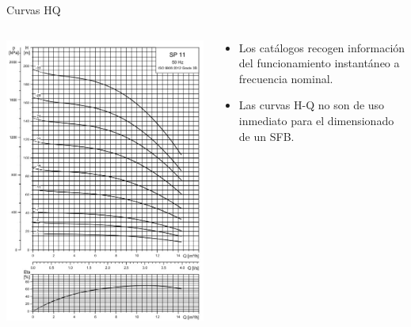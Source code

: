 \documentclass[xcolor={usenames,svgnames,dvipsnames}]{beamer}
\begin{document}
\begin{frame}[label={sec:orgbea7fac}]{Curvas HQ}
\begin{columns}
\begin{column}{0.5\columnwidth}
\begin{center}
\includegraphics[height=0.8\textheight]{../figs/CurvaSP11.jpg}
\end{center}
\end{column}

\begin{column}{0.5\columnwidth}
\begin{itemize}
\item Los catálogos recogen información del funcionamiento instantáneo a frecuencia nominal.
\item Las curvas H-Q no son de uso inmediato para el dimensionado de un SFB.
\end{itemize}
\end{column}
\end{columns}
\end{frame}
\end{document}
